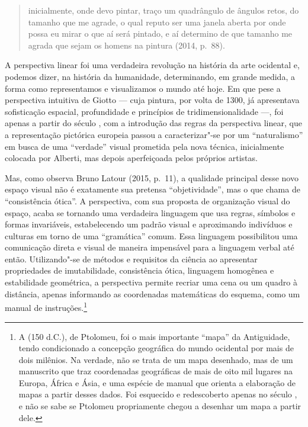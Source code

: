 \begin{quote}
inicialmente, onde devo pintar, traço um quadrângulo de ângulos retos,
do tamanho que me agrade, o qual reputo ser uma janela aberta por onde
possa eu mirar o que aí será pintado, e aí determino de que tamanho me
agrada que sejam os homens na pintura (2014, p.~88).
\end{quote}

A perspectiva linear foi uma verdadeira revolução na história da arte ocidental
e, podemos dizer, na história da humanidade, determinando, em grande
medida, a forma como representamos e visualizamos o mundo até hoje. Em
que pese a perspectiva intuitiva de Giotto --- cuja pintura, por volta de
1300, já apresentava sofisticação espacial, profundidade e princípios de
tridimensionalidade ---, foi apenas a partir do século , com a
introdução das regras da perspectiva linear, que a representação
pictórica europeia passou a caracterizar"-se por um ``naturalismo'' em
busca de uma ``verdade'' visual prometida pela nova técnica,
inicialmente colocada por Alberti, mas depois aperfeiçoada pelos
próprios artistas.

Mas, como observa Bruno Latour (2015, p.~11), a qualidade principal
desse novo espaço visual não é exatamente sua pretensa ``objetividade'',
mas o que chama de ``consistência ótica''. A perspectiva, com sua
proposta de organização visual do espaço, acaba se tornando uma
verdadeira linguagem que usa regras, símbolos e formas invariáveis,
estabelecendo um padrão visual e aproximando indivíduos e culturas em
torno de uma ``gramática'' comum. Essa linguagem possibilitou uma
comunicação direta e visual de maneira impensável para a linguagem
verbal até então. Utilizando"-se de métodos e requisitos da ciência ao
apresentar propriedades de imutabilidade, consistência ótica, linguagem
homogênea e estabilidade geométrica, a perspectiva permite recriar uma
cena ou um quadro à distância, apenas informando as coordenadas
matemáticas do esquema, como um manual de instruções.\footnote{A
  {} (150 d.C.), de Ptolomeu, foi o mais importante
  ``mapa'' da Antiguidade, tendo condicionado a concepção geográfica do
  mundo ocidental por mais de dois milênios. Na verdade, não se trata de
  um mapa desenhado, mas de um manuscrito que traz coordenadas
  geográficas de mais de oito mil lugares na Europa, África e Ásia, e
  uma espécie de manual que orienta a elaboração de mapas a partir
  desses dados. Foi esquecido e redescoberto apenas no século , e
  não se sabe se Ptolomeu propriamente chegou a desenhar um mapa a
  partir dele.}

